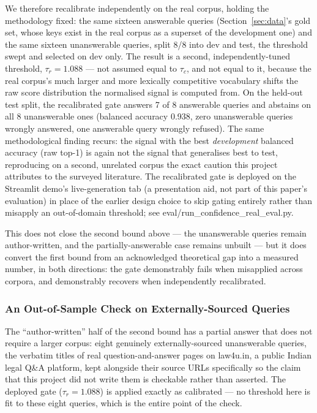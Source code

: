 \documentclass[conference]{IEEEtran}
\begin{document}
We therefore recalibrate independently on the real corpus, holding the
methodology fixed: the same sixteen answerable queries (Section~\ref{sec:data}'s
gold set, whose keys exist in the real corpus as a superset of the
development one) and the same sixteen unanswerable queries, split 8/8 into
dev and test, the threshold swept and selected on dev only. The result is a
second, independently-tuned threshold, $\tau_r = 1.088$ --- not assumed equal
to $\tau_c$, and not equal to it, because the real corpus's much larger and
more lexically competitive vocabulary shifts the raw score distribution the
normalised signal is computed from. On the held-out test split, the
recalibrated gate answers 7 of 8 answerable queries and abstains on all 8
unanswerable ones (balanced accuracy 0.938, zero unanswerable queries
wrongly answered, one answerable query wrongly refused). The same
methodological finding recurs: the signal with the best \emph{development}
balanced accuracy (raw top-1) is again not the signal that generalises best
to test, reproducing on a second, unrelated corpus the exact caution this
project attributes to the surveyed literature. The recalibrated gate is
deployed on the Streamlit demo's live-generation tab (a presentation aid, not
part of this paper's evaluation) in place of the earlier design choice to
skip gating entirely rather than misapply an out-of-domain threshold; see
eval/run\_confidence\_real\_eval.py.

This does not close the second bound above --- the unanswerable queries
remain author-written, and the partially-answerable case remains unbuilt ---
but it does convert the first bound from an acknowledged theoretical gap into
a measured number, in both directions: the gate demonstrably fails when
misapplied across corpora, and demonstrably recovers when independently
recalibrated.

\subsubsection{An Out-of-Sample Check on Externally-Sourced Queries}

The ``author-written'' half of the second bound has a partial answer that
does not require a larger corpus: eight genuinely externally-sourced
unanswerable queries, the verbatim titles of real question-and-answer pages
on law4u.in, a public Indian legal Q\&A platform, kept alongside their source
URLs specifically so the claim that this project did not write them is
checkable rather than asserted. The deployed gate ($\tau_r=1.088$) is applied
exactly as calibrated --- no threshold here is fit to these eight queries,
which is the entire point of the check.
\end{document}
